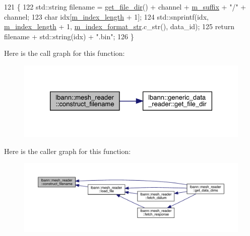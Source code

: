 \begin{DoxyCode}
121                                                                         \{
122   std::string filename = \hyperlink{classlbann_1_1generic__data__reader_ab4c6c2d4ba40ece809ce896828c8ff03}{get\_file\_dir}() + channel + \hyperlink{classlbann_1_1mesh__reader_aefadeb4ee1b9202dcadb4625da21c451}{m\_suffix} + \textcolor{stringliteral}{"/"} + channel;
123   \textcolor{keywordtype}{char} idx[\hyperlink{classlbann_1_1mesh__reader_a43c1aec4b0f635f6f7bf52944ace1883}{m\_index\_length} + 1];
124   std::snprintf(idx, \hyperlink{classlbann_1_1mesh__reader_a43c1aec4b0f635f6f7bf52944ace1883}{m\_index\_length} + 1, \hyperlink{classlbann_1_1mesh__reader_ae30866c8ae510d06eb63264de35917be}{m\_index\_format\_str}.c\_str(), 
      data\_id);
125   \textcolor{keywordflow}{return} filename + std::string(idx) + \textcolor{stringliteral}{".bin"};
126 \}
\end{DoxyCode}
Here is the call graph for this function\+:\nopagebreak
\begin{figure}[H]
\begin{center}
\leavevmode
\includegraphics[width=326pt]{classlbann_1_1mesh__reader_a61fd5f3231815ec79eb3cf17070509f9_cgraph}
\end{center}
\end{figure}
Here is the caller graph for this function\+:\nopagebreak
\begin{figure}[H]
\begin{center}
\leavevmode
\includegraphics[width=350pt]{classlbann_1_1mesh__reader_a61fd5f3231815ec79eb3cf17070509f9_icgraph}
\end{center}
\end{figure}
\mbox{\label{classlbann_1_1mesh__reader_ae89964739df2b688f56081292e6e24e1}} 
